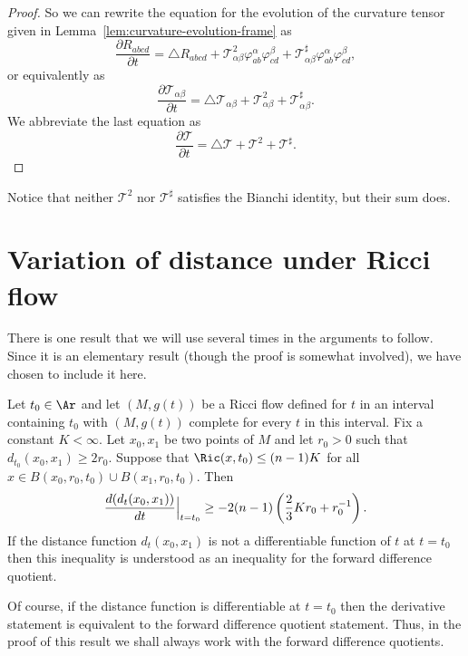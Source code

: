 \begin{proof}
So we can rewrite the equation for the evolution of the curvature
tensor given in Lemma~\ref{lem:curvature-evolution-frame} as \[ \frac{\partial R_{abcd}
}{\partial t} = \triangle R_{abcd} + {\mathcal
T}^{2}_{\alpha\beta}\varphi^{\alpha}_{ab}\varphi^{\beta}_{cd} +
{\mathcal
T}^{\sharp}_{\alpha\beta}\varphi^{\alpha}_{ab}\varphi^{\beta}_{cd},
\] or equivalently as \[ \frac{\partial {\mathcal T}_{\alpha\beta}}{\partial t}
= \triangle {\mathcal T}_{\alpha\beta} + {\mathcal
T}^{2}_{\alpha\beta} + {\mathcal T}^{\sharp}_{\alpha\beta}. \] We
abbreviate the last equation as
\[ \frac{\partial {\mathcal T}}{\partial t}= \triangle {\mathcal T} + {\mathcal T}^{2} +
{\mathcal T}^{\sharp}.\]
\end{proof}

\begin{remark}\label{rem:bianchi-identity-operator-squares}
Notice that neither ${\mathcal T}^{2}$ nor ${\mathcal T}^{\sharp}$
satisfies the Bianchi identity, but their sum does.
\end{remark}


\section{Variation of distance under Ricci flow}

There is one result that we will use several times in the arguments
to follow. Since it is an elementary result (though the proof is
somewhat involved), we have chosen to include it here.

\begin{proposition}\label{prop:distance-variation-lower-bound}
\label{I.8.3}
 Let $t_0\in \Ar$ and let $(M,g(t))$ be a Ricci flow defined for $t$ in an interval containing $t_0$
 with $(M,g(t))$ complete for every $t$ in this interval. Fix a constant $K<\infty$.  Let $x_0,x_1$ be two points
of $M$ and let $r_0>0$ such that $d_{t_0}(x_0,x_1)\ge 2r_0$. Suppose
that $\Ric(x,t_0)\le (n-1)K$ for all $x\in B(x_0,r_0,t_0)\cup
B(x_1,r_0,t_0)$. Then
$$\frac{d(d_t(x_0,x_1))}{dt}\Bigl|_{t=t_0}\Bigr.\ge -2(n-1)\left(\frac{2}{3}Kr_0+r_0^{-1}\right).$$
 If the distance function $d_{t}(x_0,x_1)$ is not a differentiable
function of $t$ at $t=t_0$ then this inequality is understood as an
inequality for the forward difference quotient.
\end{proposition}


\begin{remark}\label{rem:forward-difference-quotient}
Of course, if the distance function is differentiable at $t=t_0$
then the derivative statement is equivalent to the forward
difference quotient statement. Thus, in the proof of this result we
shall always work with the forward difference quotients.
\end{remark}

